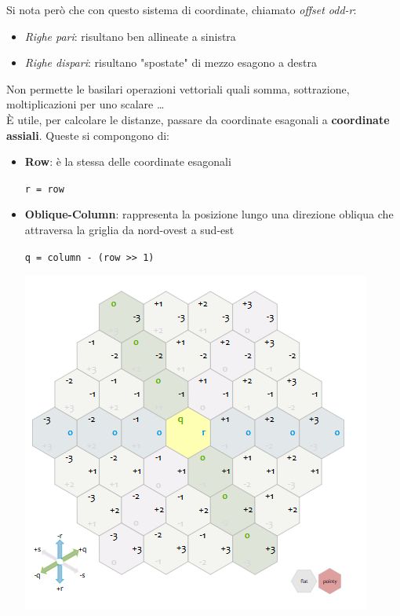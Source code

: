 \documentclass{article}
\begin{document}
Si nota però che con questo sistema di coordinate, chiamato \textit{offset odd-r}:
\begin{itemize}
    \item \textit{Righe pari}: risultano ben allineate a sinistra
    \item \textit{Righe dispari}: risultano "spostate" di mezzo esagono a destra
\end{itemize}
Non permette le basilari operazioni vettoriali quali somma, sottrazione, moltiplicazioni per uno scalare \dots\\

È utile, per calcolare le distanze, passare da coordinate esagonali a \textbf{coordinate assiali}. Queste si compongono di:
\begin{itemize}
    \item \textbf{Row}: è la stessa delle coordinate esagonali
    \begin{center}
        \texttt{r = row}
    \end{center}
    \item \textbf{Oblique-Column}: rappresenta la posizione lungo una direzione obliqua che attraversa la griglia da nord-ovest a sud-est
    \begin{center}
        \texttt{q = column - (row >> 1)}
    \end{center}
    \begin{center}
        \includegraphics[scale=0.7]{axial}
    \end{center}
\end{itemize}
\end{document}
